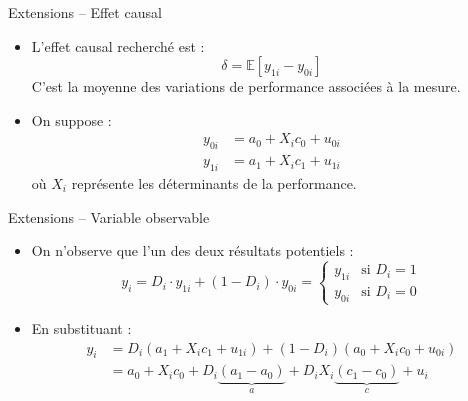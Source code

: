 \documentclass[11pt,aspectratio=169]{beamer}
\newcommand{\E}{\mathbb{E}}
\begin{document}
\begin{frame}{Extensions -- Effet causal}

\begin{itemize}

\item L'effet causal recherché est :
  \[
  \delta = \E[y_{1i} - y_{0i}]
  \]
  C'est la moyenne des variations de performance associées à la mesure.\newline

\item On suppose :
  \begin{align*}
      y_{0i} &= a_0 + X_i c_0 + u_{0i} \\
      y_{1i} &= a_1 + X_i c_1 + u_{1i}
  \end{align*}
  où $X_i$ représente les déterminants de la performance.

\end{itemize}

\end{frame}

\begin{frame}{Extensions -- Variable observable}

\begin{itemize}

\item On n'observe que l'un des deux résultats potentiels :
  \[
  y_i = D_i \cdot y_{1i} + (1 - D_i) \cdot y_{0i} = \begin{cases}
      y_{1i} & \text{si } D_i = 1 \\
      y_{0i} & \text{si } D_i = 0
  \end{cases}
  \]\newline

\item En substituant :
  \begin{align*}
      y_i &= D_i(a_1 + X_i c_1 + u_{1i}) + (1-D_i)(a_0 + X_i c_0 + u_{0i}) \\
      &= a_0 + X_i c_0 + D_i \underbrace{(a_1 - a_0)}_{a} + D_i X_i \underbrace{(c_1 - c_0)}_{c} + u_i
  \end{align*}

\end{itemize}

\end{frame}
\end{document}
